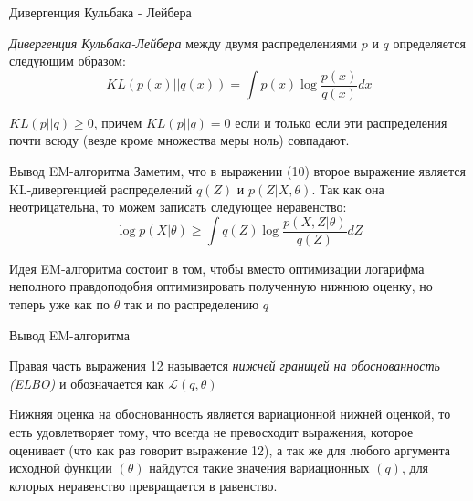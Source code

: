\documentclass[russian]{vegapresentation}
\begin{document}
    \begin{frame}{Дивергенция Кульбака - Лейбера}
		\begin{definition}
			\textit{Дивергенция Кульбака-Лейбера} между двумя распределениями $p$ и $q$ определяется следующим образом: 
			\begin{equation}
				KL(p(x) || q(x)) = \int p(x) \log \frac{p(x)}{q(x)} dx
			\end{equation}
		\end{definition}
		
		\begin{theorem}
			$KL(p||q) \geqslant 0$, причем $KL(p||q) = 0$ если и только если эти распределения почти всюду (везде кроме множества меры ноль) совпадают.
		\end{theorem}
    \end{frame}
    
	\begin{frame}{Вывод EM-алгоритма}
    		Заметим, что в выражении (10) второе выражение является KL-дивергенцией распределений $q(Z)$ и $p(Z|X, \theta)$. Так как она неотрицательна, то можем записать следующее неравенство:
    		\begin{equation}
    			\log p(X|\theta) \geqslant \int q(Z) \log \frac{p(X, Z| \theta)}{q(Z)} dZ
    		\end{equation}
    		
    		Идея EM-алгоритма состоит в том, чтобы вместо оптимизации логарифма неполного правдоподобия оптимизировать полученную нижнюю оценку, но теперь уже как по $\theta$ так и по распределению $q$
    	\end{frame}
    	
    	\begin{frame}{Вывод EM-алгоритма}
		\begin{definition}
			Правая часть выражения 12 называется \textit{нижней границей на обоснованность (ELBO)} и обозначается как $\mathcal{L}(q, \theta)$
		\end{definition}
		Нижняя оценка на обоснованность является вариационной нижней оценкой, то есть удовлетворяет тому, что всегда не превосходит выражения, которое оценивает (что как раз говорит выражение 12), а так же для любого аргумента исходной функции $(\theta)$ найдутся такие значения вариационных $(q)$, для которых неравенство превращается в равенство.
    	\end{frame}
    	
\end{document}
